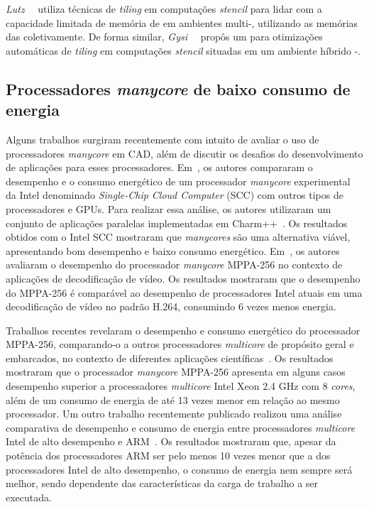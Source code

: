 \emph{Lutz}~\etal~\cite{lutz13} utiliza técnicas de \textit{tiling} em
computações \textit{stencil} para lidar com a capacidade limitada de memória
de \gpus em ambientes multi-\gpu, utilizando as memórias das \gpus
coletivamente. De forma similar, \emph{Gysi}~\etal~\cite{gysi15} propôs um \fw
para otimizações automáticas de \textit{tiling} em computações \textit{stencil}
situadas em um ambiente híbrido \cpu{}-\gpu.


\subsection{Processadores \textit{manycore} de baixo consumo de energia}
Alguns trabalhos surgiram recentemente com intuito de avaliar o uso de
processadores \emph{manycore} em CAD, além de discutir os desafios do
desenvolvimento de aplicações para esses processadores.
Em~\cite{SCCEnergy:2012}, os autores compararam o desempenho e o consumo
energético de um processador \emph{manycore} experimental da Intel denominado
\emph{Single-Chip Cloud Computer} (SCC) com outros tipos de processadores e
GPUs. Para realizar essa análise, os autores utilizaram um conjunto de
aplicações paralelas implementadas em Charm++~\cite{Charm:2012}. Os resultados
obtidos com o Intel SCC mostraram que \emph{manycores} são uma alternativa
viável, apresentando bom desempenho e baixo consumo energético.
Em~\cite{MPPA-1:2013}, os autores avaliaram o desempenho do processador
\emph{manycore} MPPA-256 no contexto de aplicações de decodificação de vídeo. Os
resultados mostraram que o desempenho do MPPA-256 é comparável ao desempenho de
processadores Intel atuais em uma decodificação de vídeo no padrão H.264,
consumindo 6 vezes menos energia.

Trabalhos recentes revelaram o desempenho e consumo energético do processador
MPPA-256, comparando-o a outros processadores \textit{multicore} de propósito
geral e embarcados, no contexto de diferentes aplicações
científicas~\cite{Castro-SBAC-PAD:2014,Castro-IA3:2013,Castro-IA3-JPDC:2014}. Os
resultados mostraram que o processador \emph{manycore} MPPA-256 apresenta em
alguns casos desempenho superior a processadores \emph{multicore} Intel Xeon 2.4
GHz com 8 \emph{cores}, além de um consumo de energia de até 13 vezes menor em
relação ao mesmo processador. Um outro trabalho recentemente publicado realizou
uma análise comparativa de desempenho e consumo de energia entre processadores
\emph{multicore} Intel de alto desempenho e ARM~\cite{Castro-Padoin-IET:2015}.
Os resultados mostraram que, apesar da potência dos processadores ARM ser pelo
menos 10 vezes menor que a dos processadores Intel de alto desempenho, o consumo
de energia nem sempre será melhor, sendo dependente das características da carga
de trabalho a ser executada.

